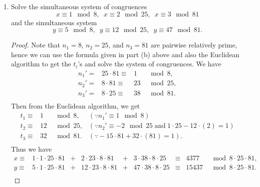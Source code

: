 \documentclass{article}
\begin{document}
\begin{enumerate}[label={\bf(\alph*)}]
      \begin{proof}
        We show that the given $x$ is a solution to the set of congruences.
        Given any $i\in\{1,\ldots,k\}$, we want to show that $x\equiv
        a_i\mod{n_i}$. Now for each $j\in\{1,\ldots,k\}$ with $j\neq i$, we
        have $n_j|n_i'$, and so $a_jt_jn_j'\equiv0\mod{n_i}$. Therefore
        $x\equiv a_it_in_i'\mod{n_i}$. Then since
        $t_in_i'\equiv1\mod{n_i}$, we have $x\equiv a_it_in_i'\equiv
        a_i\mod{n_i}$, as required.
      \end{proof}

    \item Solve the simultaneous system of congruences
      \[x\equiv1\mod{8},\;\; x\equiv2\mod{25},\;\; x\equiv3\mod{81}\]
      and the simultaneous system
      \[y\equiv5\mod{8},\;\; y\equiv12\mod{25},\;\; y\equiv47\mod{81}.\]

      \begin{proof}
        Note that $n_1=8$, $n_2=25$, and $n_3=81$ are pairwise relatively
        prime, hence we can use the formula given in part (b) above and
        also the Euclidean algorithm to get the $t_i$'s and solve the
        system of congruences. We have
        \[\begin{array}{lrrl}
          n_1'= &25\cdot81\equiv &1  &\mod{8}, \\
          n_2'= &8\cdot81\equiv  &23 &\mod{25}, \\
          n_3'= &8\cdot25\equiv  &38 &\mod{81}. \\
        \end{array}\]
        Then from the Euclidean algorithm, we get
        \[\begin{array}{lrll}
          t_1\equiv &1  &\mod{8},  &(\because n_1'\equiv1\mod{8}) \\
          t_2\equiv &12 &\mod{25}, &(\because n_2'\equiv-2\mod{25}\;
            \text{and}\; 1\cdot25-12\cdot(2)=1) \\
          t_3\equiv &32 &\mod{81}. &(\because -15\cdot81+32\cdot(81)=1). \\
        \end{array}\]
        Thus we have
        \[\begin{array}{llcrcrcrr}
          x\equiv &1\cdot1\cdot25\cdot81 &+ &2\cdot23\cdot8\cdot81
            &+ &3\cdot38\cdot8\cdot25 &\equiv &4377 &\mod{8\cdot25\cdot81},
            \\
          y\equiv &5\cdot1\cdot25\cdot81 &+ &12\cdot23\cdot8\cdot81
            &+ &47\cdot38\cdot8\cdot25 &\equiv &15437
            &\mod{8\cdot25\cdot81}. \\
        \end{array}\]
      \end{proof}
  \end{enumerate}
\end{document}
